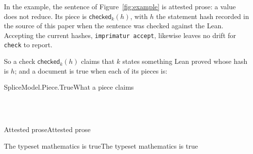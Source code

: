 \documentclass[acmsmall,screen,review,anonymous,nonacm]{acmart}
\begin{document}
In the example, the sentence of Figure~\ref{fig:example} is attested prose: a value does not reduce. Its piece is
$\mathsf{checked}_{k}(h)$, with $h$ the statement hash recorded in the
source of this paper when the sentence was checked against the Lean. Accepting the current hashes, \verb|imprimatur accept|, likewise leaves no
drift for \verb|check| to report.

So a check $\mathsf{checked}_{k}(h)$ claims that $k$ states something Lean
proved whose hash is $h$; and a document is true when each of its pieces
is:

\begin{leandef}[sum=dzWzl4ICeZ, dflt=tGvn9VSVcQ]{SpliceModel.Piece.True}{What a piece claims}
\begin{LeanDisplay}
\\
\\
\end{LeanDisplay}
\end{leandef}

\begin{leantheorem}[sum=YuyPcDgbsu]{Attested prose}{Attested prose}
\label{thm:Attested-prose}
\end{leantheorem}

\begin{leantheorem}[sum=_jhiARqWZl]{The typeset mathematics is true}{The typeset mathematics is true}
\label{thm:The-typeset-mathematics-is-true}
\end{leantheorem}
\end{document}
